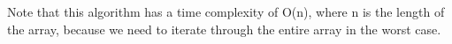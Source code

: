 \documentclass[preview]{standalone}
\begin{document}
Note that this algorithm has a time complexity of O(n), where n is the length of the array, because we need to iterate through the entire array in the worst case.\\
\end{document}
